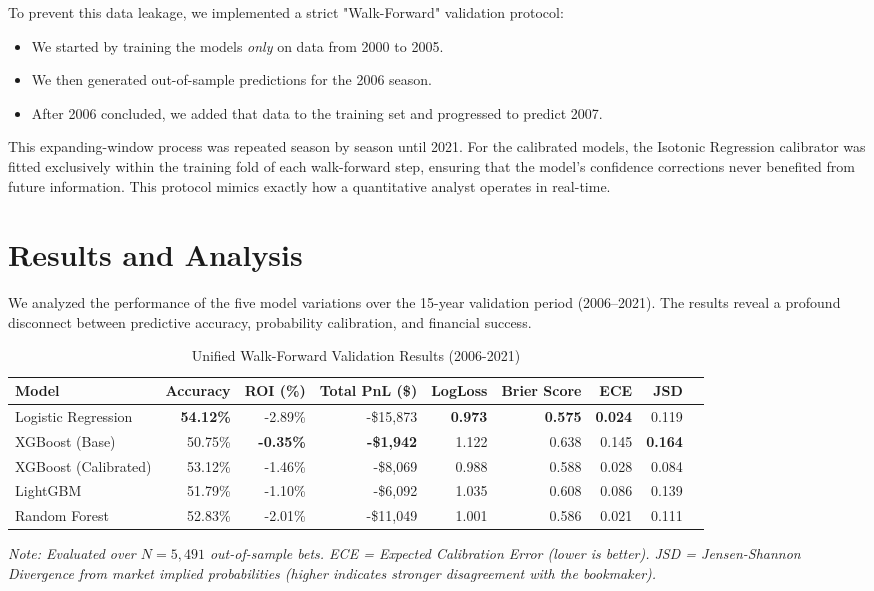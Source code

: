 \documentclass[pdflatex,sn-basic]{sn-jnl}
\begin{document}
To prevent this data leakage, we implemented a strict "Walk-Forward" validation protocol:
\begin{itemize}
    \item We started by training the models \textit{only} on data from 2000 to 2005.
    \item We then generated out-of-sample predictions for the 2006 season.
    \item After 2006 concluded, we added that data to the training set and progressed to predict 2007.
\end{itemize}
This expanding-window process was repeated season by season until 2021. For the calibrated models, the Isotonic Regression calibrator was fitted exclusively within the training fold of each walk-forward step, ensuring that the model's confidence corrections never benefited from future information. This protocol mimics exactly how a quantitative analyst operates in real-time.

\section{Results and Analysis}
We analyzed the performance of the five model variations over the 15-year validation period (2006–2021). The results reveal a profound disconnect between predictive accuracy, probability calibration, and financial success.

\begin{table}[htbp]
\centering
\caption{Unified Walk-Forward Validation Results (2006-2021)}
\label{tab:walkforward}
\setlength{\tabcolsep}{3pt}
\small
\begin{tabular}{@{}lrrrrrrrr@{}}
\toprule
\textbf{Model} & \textbf{Accuracy} & \textbf{ROI (\%)} & \textbf{Total PnL (\$)} & \textbf{LogLoss} & \textbf{Brier Score} & \textbf{ECE} & \textbf{JSD} \\ \midrule
Logistic Regression & \textbf{54.12\%} & -2.89\% & -\$15,873 & \textbf{0.973} & \textbf{0.575} & \textbf{0.024} & 0.119 \\
XGBoost (Base) & 50.75\% & \textbf{-0.35\%} & \textbf{-\$1,942} & 1.122 & 0.638 & 0.145 & \textbf{0.164} \\
XGBoost (Calibrated) & 53.12\% & -1.46\% & -\$8,069 & 0.988 & 0.588 & 0.028 & 0.084 \\
LightGBM & 51.79\% & -1.10\% & -\$6,092 & 1.035 & 0.608 & 0.086 & 0.139 \\
Random Forest & 52.83\% & -2.01\% & -\$11,049 & 1.001 & 0.586 & 0.021 & 0.111 \\ \bottomrule
\end{tabular}%
\vspace{0.5em}
\raggedright
\small{\textit{Note: Evaluated over $N=5,491$ out-of-sample bets. ECE = Expected Calibration Error (lower is better). JSD = Jensen-Shannon Divergence from market implied probabilities (higher indicates stronger disagreement with the bookmaker).}}
\end{table}
\end{document}
